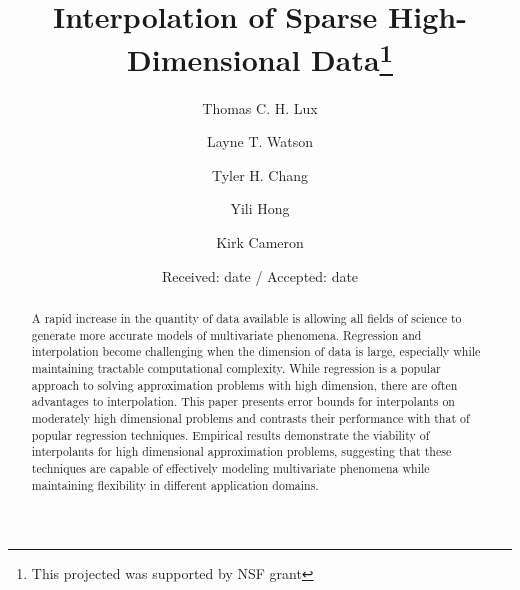 \documentclass[smallextended]{svjour3}       %
\begin{document}
\title{Interpolation of Sparse High-Dimensional Data\thanks{This
    projected was supported by NSF grant}
}


\author{Thomas C. H. Lux   \and
  Layne T. Watson          \and
  Tyler H. Chang           \and
  Yili Hong                \and
  Kirk Cameron
}



\date{Received: date / Accepted: date}

\maketitle

\begin{abstract}
A rapid increase in the quantity of data available is allowing all fields of science to generate more accurate models of multivariate phenomena. Regression and interpolation become challenging when the dimension of data is large, especially while maintaining tractable computational complexity. While regression is a popular approach to solving approximation problems with high dimension, there are often advantages to interpolation. This paper presents error bounds for interpolants on moderately high dimensional problems and contrasts their performance with that of popular regression techniques. Empirical results demonstrate the viability of interpolants for high dimensional approximation problems, suggesting that these techniques are capable of effectively modeling multivariate phenomena while maintaining flexibility in different application domains.

\end{abstract}

\end{document}
